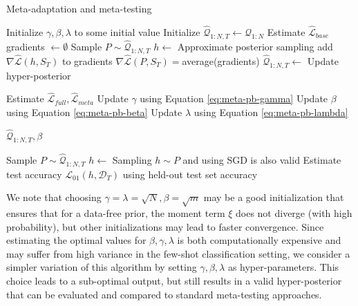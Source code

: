 \documentclass{article}
\theoremstyle{definition}
\begin{document}
\begin{algorithm}[H]
	\caption{Meta-adaptation and meta-testing}
	\label{alg1}
	\small
	\begin{algorithmic}
		\State Initialize $\gamma, \beta, \lambda$ to some initial value 
		\State Initialize $\hat{\mathcal{Q}}_{1:N, T}\leftarrow \mathcal{Q}_{1:N}$
		\State Estimate $\hat{\mathcal{L}}_{base}$
			\State gradients $\leftarrow \emptyset$
				\State Sample $P\sim \hat{\mathcal{Q}}_{1:N, T}$
				\State $h\leftarrow$  \Comment Approximate posterior sampling
				\State add $\nabla \hat{\mathcal{L}}(h, S_T)$ to gradients
			\EndFor
			\State $\nabla \hat{\mathcal{L}}(P, S_T)=$average(gradients)
			\State $\hat{\mathcal{Q}}_{1:N, T}\leftarrow$  \Comment Update hyper-posterior
			
			\State Estimate $\hat{\mathcal{L}}_{full}, \hat{\mathcal{L}}_{meta}$
			\State Update $\gamma$ using Equation \ref{eq:meta-pb-gamma}
			\State Update $\beta$ using Equation \ref{eq:meta-pb-beta}
			\State Update $\lambda$ using Equation \ref{eq:meta-pb-lambda}
			
		\EndWhile
		\State \Return $\hat{\mathcal{Q}}_{1:N, T}, \beta$
		\EndFunction
		
		\State Sample $P\sim \hat{\mathcal{Q}}_{1:N, T}$
		\State $h\leftarrow$  \Comment Sampling $h\sim P$ and using SGD is also valid
		\State Estimate test accuracy $\mathcal{L}_{01}(h, \mathcal{D}_T)$ using held-out test set
		\State \Return accuracy
		\EndFunction
	\end{algorithmic}
\end{algorithm}

We note that choosing $\gamma=\lambda=\sqrt{N}, \beta=\sqrt{m}$ may be a good initialization that ensures that for a data-free prior, the moment term $\xi$ does not diverge (with high probability), but other initializations may lead to faster convergence. Since estimating the optimal values for $\beta,\gamma,\lambda$ is both computationally expensive and may suffer from high variance in the few-shot classification setting, we consider a simpler variation of this algorithm by setting $\gamma, \beta, \lambda$ as hyper-parameters. This choice leads to a sub-optimal output, but still results in a valid hyper-posterior that can be evaluated and compared to standard meta-testing approaches.
\end{document}
